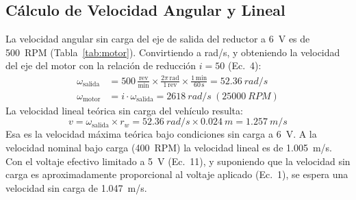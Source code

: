 \documentclass[conference]{IEEEtran}
\newcommand{\valWheelRadiusM}{0.024}
\newcommand{\valNoLoadRadS}{52.36}
\newcommand{\valMotorShaftRpm}{25000}
\newcommand{\valMotorShaftRadS}{2618}
\newcommand{\valSpeedNoLoad}{1.257}
\newcommand{\valSpeedRated}{1.005}
\newcommand{\valSpeedLimited}{1.047}
\begin{document}
\subsection{Cálculo de Velocidad Angular y Lineal}
La velocidad angular sin carga del eje de salida del reductor a \SI{6}{V} es de \SI{500}{RPM} (Tabla~\ref{tab:motor}). Convirtiendo a rad/s, y obteniendo la velocidad del eje del motor con la relación de reducción $i = 50$ (Ec.~4):
\begin{equation}
\begin{aligned}
\omega_{\text{salida}} &= 500\,\frac{\text{rev}}{\text{min}}\times\frac{2\pi\,\text{rad}}{1\,\text{rev}}\times\frac{1\,\text{min}}{60\,\text{s}} = \SI{\valNoLoadRadS}{rad/s}\\
\omega_{\text{motor}} &= i\cdot\omega_{\text{salida}} = \SI{\valMotorShaftRadS}{rad/s}\ (\SI{\valMotorShaftRpm}{RPM})
\end{aligned}
\end{equation}
La velocidad lineal teórica sin carga del vehículo resulta:
\begin{equation}
v = \omega_{\text{salida}} \times r_w = \SI{\valNoLoadRadS}{rad/s}\times\SI{\valWheelRadiusM}{m} = \SI{\valSpeedNoLoad}{m/s}
\end{equation}
Esa es la velocidad máxima teórica bajo condiciones sin carga a \SI{6}{V}. A la velocidad nominal bajo carga (\SI{400}{RPM}) la velocidad lineal es de \SI{\valSpeedRated}{m/s}. Con el voltaje efectivo limitado a \SI{5}{V} (Ec.~11), y suponiendo que la velocidad sin carga es aproximadamente proporcional al voltaje aplicado (Ec.~1), se espera una velocidad sin carga de \SI{\valSpeedLimited}{m/s}.
\end{document}
